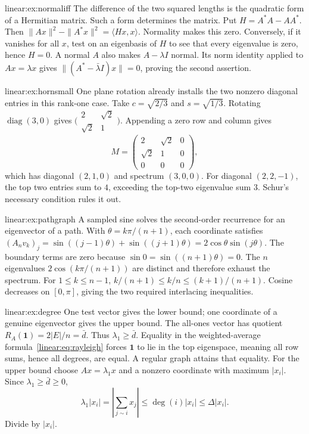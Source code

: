 \begin{solution}{linear:ex:normaliff}
\idea The difference of the two squared lengths is the quadratic form of a Hermitian matrix. Such a form determines the matrix.
\writeup Put $H=A^*A-AA^*$. Then $\|Ax\|^2-\|A^*x\|^2=\langle Hx,x\rangle$. Normality makes this zero. Conversely, if it vanishes for all $x$, test on an eigenbasis of $H$ to see that every eigenvalue is zero, hence $H=0$. A normal $A$ also makes $A-\lambda I$ normal. Its norm identity applied to $Ax=\lambda x$ gives $\|(A^*-\bar\lambda I)x\|=0$, proving the second assertion.
\end{solution}
\begin{solution}{linear:ex:hornsmall}
\idea One plane rotation already installs the two nonzero diagonal entries in this rank-one case.
\writeup Take $c=\sqrt{2/3}$ and $s=\sqrt{1/3}$. Rotating $\operatorname{diag}(3,0)$ gives $\bigl(\begin{smallmatrix}2&\sqrt2\\\sqrt2&1\end{smallmatrix}\bigr)$. Appending a zero row and column gives
\[M=\begin{pmatrix}2&\sqrt2&0\\\sqrt2&1&0\\0&0&0\end{pmatrix},\]
which has diagonal $(2,1,0)$ and spectrum $(3,0,0)$. For diagonal $(2,2,-1)$, the top two entries sum to $4$, exceeding the top-two eigenvalue sum $3$. Schur's necessary condition rules it out.
\end{solution}
\begin{solution}{linear:ex:pathgraph}
\idea A sampled sine solves the second-order recurrence for an eigenvector of a path.
\writeup With $\theta=k\pi/(n+1)$, each coordinate satisfies $(A_nv_k)_j=\sin((j-1)\theta)+\sin((j+1)\theta)=2\cos\theta\sin(j\theta)$. The boundary terms are zero because $\sin0=\sin((n+1)\theta)=0$. The $n$ eigenvalues $2\cos(k\pi/(n+1))$ are distinct and therefore exhaust the spectrum. For $1\le k\le n-1$, $k/(n+1)\le k/n\le(k+1)/(n+1)$. Cosine decreases on $[0,\pi]$, giving the two required interlacing inequalities.
\end{solution}
\begin{solution}{linear:ex:degree}
\idea One test vector gives the lower bound; one coordinate of a genuine eigenvector gives the upper bound.
\writeup The all-ones vector has quotient $R_A(\mathbf1)=2|E|/n=\bar d$. Thus $\lambda_1\ge\bar d$. Equality in the weighted-average formula~\eqref{linear:eq:rayleigh} forces $\mathbf1$ to lie in the top eigenspace, meaning all row sums, hence all degrees, are equal. A regular graph attains that equality. For the upper bound choose $Ax=\lambda_1x$ and a nonzero coordinate with maximum $|x_i|$. Since $\lambda_1\ge\bar d\ge0$,
\[\lambda_1|x_i|=\left|\sum_{j\sim i}x_j\right|\le\deg(i)|x_i|\le\Delta|x_i|.\]
Divide by $|x_i|$.
\end{solution}
